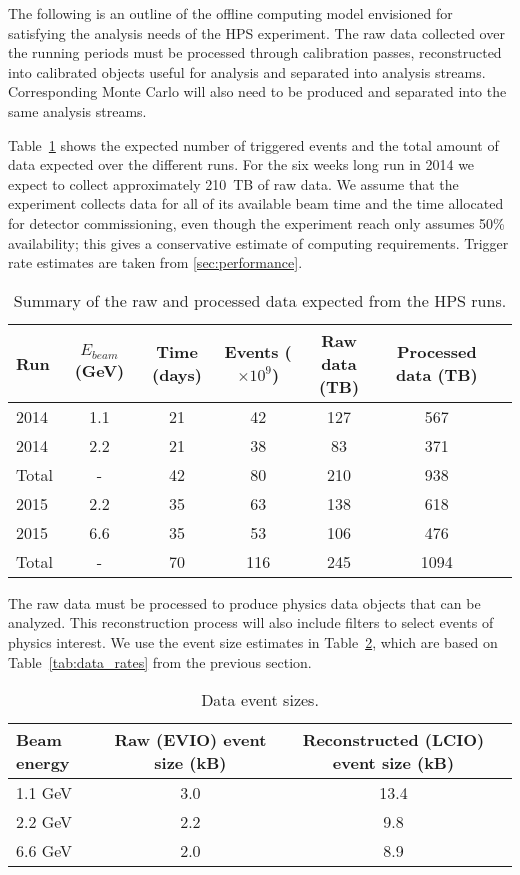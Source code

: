 
The following is an outline of the offline computing model envisioned for satisfying the analysis needs of the HPS experiment. The raw data collected over the running periods must be processed through calibration passes, reconstructed into calibrated objects useful for analysis and separated into analysis streams. Corresponding Monte Carlo will also need to be produced and separated into the same analysis streams.

Table~\ref{tab:data_volume} shows the expected number of triggered events and
the total amount of data expected over the 
different runs. For the six weeks long run in 2014 we expect to collect approximately 210~TB of raw data. 
We assume that the experiment collects data for all of its available beam time and the time allocated for detector commissioning, even though the experiment reach only assumes 50\% availability; this gives a conservative estimate of computing requirements. 
Trigger rate estimates are taken from \ref{sec:performance}.
\begin{table}[]
\centering
\begin{tabular}{|l|c|c|c|c|c|c|}
\hline
Run & $E_{beam}$ (GeV) & Time (days) & Events ($\times 10^9$) & Raw data (TB) & Processed data (TB)\\
\hline
2014 & 1.1 & 21 & 42 & 127 & 567 \\
2014 & 2.2 & 21 & 38 & 83 & 371  \\
\hline
Total & - & 42 & 80 & 210 & 938 \\
\hline
2015 & 2.2 & 35 & 63 & 138 & 618 \\
2015 & 6.6 & 35 & 53 & 106 & 476 \\
\hline
Total & - & 70 & 116 & 245 & 1094 \\
\hline
\end{tabular}
\caption{{\small Summary of the raw and processed data expected from the HPS runs. }}
\label{tab:data_volume}
\end{table}

The raw data must be processed to produce physics data objects that can be analyzed. This reconstruction process will also include filters to select events of physics interest. We use the event size estimates 
in Table~\ref{tab:raw_data_size}, which are based on Table~\ref{tab:data_rates} from the previous section. 
\begin{table}[]
\centering
\begin{tabular}{|l|c|c|}
\hline
Beam energy & Raw (EVIO) event size (kB) & Reconstructed (LCIO) event size (kB) \\ 
\hline
1.1 GeV  &  3.0 & 13.4 \\
2.2 GeV  &  2.2 & 9.8 \\
6.6 GeV  &  2.0 & 8.9 \\
\hline
\end{tabular}
\caption{{\small Data event sizes. }}
\label{tab:raw_data_size}
\end{table}

